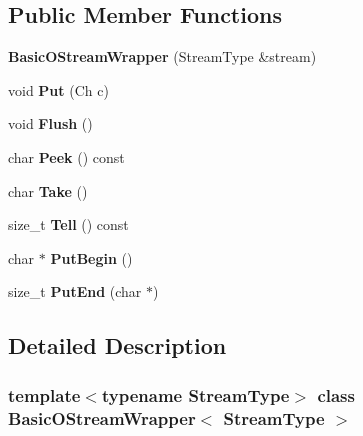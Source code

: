 \subsection*{Public Member Functions}
\begin{DoxyCompactItemize}
\item 
\mbox{\label{classBasicOStreamWrapper_a067a516c13b7c9d4dacef598d32779ef}} 
{\bfseries Basic\+O\+Stream\+Wrapper} (Stream\+Type \&stream)
\item 
\mbox{\label{classBasicOStreamWrapper_a7d3ba9d651fbe27fe05387f512154ea8}} 
void {\bfseries Put} (Ch c)
\item 
\mbox{\label{classBasicOStreamWrapper_a1c48a8b7520b0ab6ca34e665b928b56d}} 
void {\bfseries Flush} ()
\item 
\mbox{\label{classBasicOStreamWrapper_a6dc18ded82487d41a2d123e21a9e050b}} 
char {\bfseries Peek} () const
\item 
\mbox{\label{classBasicOStreamWrapper_a54be63e8d24f4d82329b860a907f65fe}} 
char {\bfseries Take} ()
\item 
\mbox{\label{classBasicOStreamWrapper_a62f214649fbfb8380a69fe92b864a61b}} 
size\+\_\+t {\bfseries Tell} () const
\item 
\mbox{\label{classBasicOStreamWrapper_a564b7b727bdab12185e7a7bd1ac5e822}} 
char $\ast$ {\bfseries Put\+Begin} ()
\item 
\mbox{\label{classBasicOStreamWrapper_a1da108e43a5a517c4484821fced1fca0}} 
size\+\_\+t {\bfseries Put\+End} (char $\ast$)
\end{DoxyCompactItemize}


\subsection{Detailed Description}
\subsubsection*{template$<$typename Stream\+Type$>$\newline
class Basic\+O\+Stream\+Wrapper$<$ Stream\+Type $>$}

